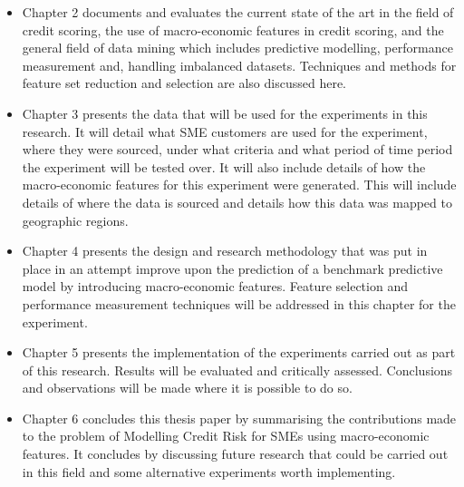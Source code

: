 \begin{itemize}
	\item Chapter 2 documents and evaluates the current state of the art in the field of credit scoring, the use of macro-economic features in credit scoring, and the general field of data mining which includes predictive modelling, performance measurement and, handling imbalanced datasets. Techniques and methods for feature set reduction and selection are also discussed here. 
	
	\item Chapter 3	presents the data that will be used for the experiments in this research. It will detail what SME customers are used for the experiment, where they were sourced, under what criteria and what period of time period the experiment will be tested over. It will also include details of how the macro-economic features for this experiment were generated. This will include details of where the data is sourced and details how this data was mapped to geographic regions.  
	
	\item Chapter 4 presents the design and research methodology that was put in place in an attempt improve upon the prediction of a benchmark predictive model by introducing macro-economic features. Feature selection and performance measurement techniques will be addressed in this chapter for the experiment.
	
	\item Chapter 5 presents the implementation of the experiments carried out as part of this research. Results will be evaluated and critically assessed. Conclusions and observations will be made where it is possible to do so. 
	
	\item Chapter 6 concludes this thesis paper by summarising the contributions made to the problem of Modelling Credit Risk for SMEs using macro-economic features. It concludes by discussing future research that could be carried out in this field and some alternative experiments worth implementing.
	
\end{itemize}

